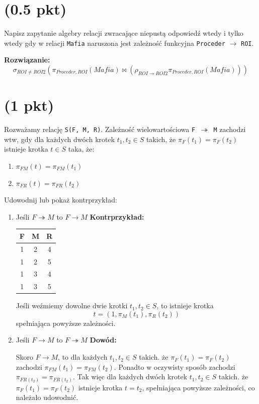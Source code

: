 \documentclass{article}
\begin{document}
\section{(0.5 pkt)} Napisz zapytanie algebry relacji zwracające niepustą odpowiedź wtedy i tylko wtedy gdy w relacji \texttt{Mafia} naruszona jest zależność funkcyjna \texttt{Proceder} $\rightarrow$ \texttt{ROI}.

\textbf{Rozwiązanie:}
\[
 \sigma_{ROI\neq ROI2}(\pi_{Proceder, ROI}(Mafia) \Join (\rho_{ROI\rightarrow ROI2}\pi_{Proceder, ROI}(Mafia)))
\]

\section{(1 pkt)} Rozważamy relację \texttt{S(F, M, R)}. Zależność wielowartościowa \texttt{F $\twoheadrightarrow$ M} zachodzi wtw, gdy dla każdych dwóch krotek $t_1, t_2 \in S$ takich, że $\pi_F(t_1) = \pi_F(t_2)$ istnieje krotka $t \in S$ taka, że: \begin{enumerate}
        \item $\pi_{FM}(t) = \pi_{FM}(t_1)$
        \item $\pi_{FR}(t) = \pi_{FR}(t_2)$
\end{enumerate}
Udowodnij lub pokaż kontrprzykład: \begin{enumerate}
        \item Jeśli $F \twoheadrightarrow M$ to $F \rightarrow M$
        \textbf{Kontrprzykład:}
        
        \begin{tabular}{|c | c | c|}
                \hline
                F & M & R \\
                \hline
                1 & 2 & 4 \\
                \hline
                1 & 2 & 5 \\
                \hline
                1 & 3 & 4 \\
                \hline
                1 & 3 & 5 \\
                \hline
        \end{tabular}
        
        Jeśli weźmiemy dowolne dwie krotki $t_1, t_2 \in S$, to istnieje krotka \[t = (1, \pi_M(t_1), \pi_R(t_2))\] spełniająca powyższe zależności.
        \item Jeśli $F \rightarrow M$ to $F \twoheadrightarrow M$
        \textbf{Dowód:}

        Skoro $F \rightarrow M$, to dla każdych $t_1, t_2 \in S$ takich. że $\pi_F(t_1) = \pi_F(t_2)$ zachodzi $\pi_{FM}(t_1) = \pi_{FM}(t_2)$. Ponadto w oczywisty sposób zachodzi $\pi_{FR(t_2)} = \pi_{FR(t_2)}$. Tak więc dla każdych dwóch krotek $t_1, t_2 \in S$ takich. że $\pi_F(t_1) = \pi_F(t_2)$ istnieje krotka $t = t_2$, spełniająca powyższe zależności, co należało udowodnić.
\end{enumerate}
\end{document}
